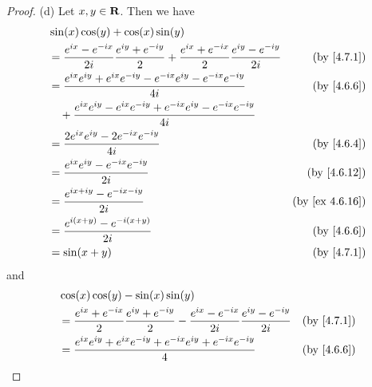 \begin{proof}{(d)}
  Let \(x, y \in \mathbf{R}\).
  Then we have
  \begin{align*}
     & \sin(x) \cos(y) + \cos(x) \sin(y)                                                                                                                             \\
     & = \frac{e^{i x} - e^{- i x}}{2 i} \frac{e^{i y} + e^{- i y}}{2} + \frac{e^{i x} + e^{- i x}}{2} \frac{e^{i y} - e^{- i y}}{2i} & \text{(by \cref{4.7.1})}     \\
     & = \frac{e^{i x} e^{i y} + e^{i x} e^{- i y} - e^{- i x} e^{i y} - e^{- i x} e^{- i y}}{4i}                                     & \text{(by \cref{4.6.6})}     \\
     & \quad + \frac{e^{i x} e^{i y} - e^{i x} e^{- i y} + e^{- i x} e^{i y} - e^{- i x} e^{- i y}}{4i}                                                              \\
     & = \frac{2 e^{i x} e^{i y} - 2 e^{- i x} e^{- i y}}{4i}                                                                         & \text{(by \cref{4.6.4})}     \\
     & = \frac{e^{i x} e^{i y} - e^{- i x} e^{- i y}}{2i}                                                                             & \text{(by \cref{4.6.12})}    \\
     & = \frac{e^{i x + i y} - e^{- i x - i y}}{2i}                                                                                   & \text{(by \cref{ex 4.6.16})} \\
     & = \frac{e^{i (x + y)} - e^{- i (x + y)}}{2i}                                                                                   & \text{(by \cref{4.6.6})}     \\
     & = \sin(x + y)                                                                                                                  & \text{(by \cref{4.7.1})}
  \end{align*}
  and
  \begin{align*}
     & \cos(x) \cos(y) - \sin(x) \sin(y)                                                                                                                            \\
     & = \frac{e^{i x} + e^{- i x}}{2} \frac{e^{i y} + e^{- i y}}{2} - \frac{e^{i x} - e^{- i x}}{2i} \frac{e^{i y} - e^{- i y}}{2i} & \text{(by \cref{4.7.1})}     \\
     & = \frac{e^{i x} e^{i y} + e^{i x} e^{- i y} + e^{- i x} e^{i y} + e^{- i x} e^{- i y}}{4}                                     & \text{(by \cref{4.6.6})}     \\

\end{align*}
\end{proof}
